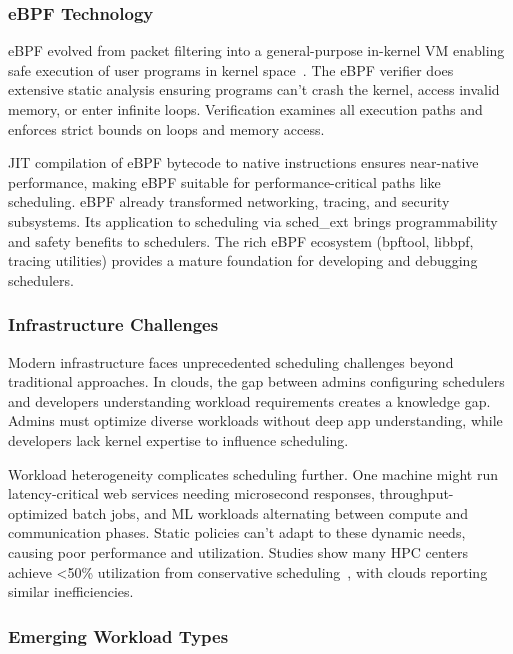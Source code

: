 \subsubsection{eBPF Technology}

eBPF evolved from packet filtering into a general-purpose in-kernel VM enabling safe execution of user programs in kernel space~\cite{mccanne1993bpf,gregg2019bpf}. The eBPF verifier does extensive static analysis ensuring programs can't crash the kernel, access invalid memory, or enter infinite loops. Verification examines all execution paths and enforces strict bounds on loops and memory access.

JIT compilation of eBPF bytecode to native instructions ensures near-native performance, making eBPF suitable for performance-critical paths like scheduling. eBPF already transformed networking, tracing, and security subsystems. Its application to scheduling via sched\_ext brings programmability and safety benefits to schedulers. The rich eBPF ecosystem (bpftool, libbpf, tracing utilities) provides a mature foundation for developing and debugging schedulers.

\subsubsection{Infrastructure Challenges}

Modern infrastructure faces unprecedented scheduling challenges beyond traditional approaches. In clouds, the gap between admins configuring schedulers and developers understanding workload requirements creates a knowledge gap. Admins must optimize diverse workloads without deep app understanding, while developers lack kernel expertise to influence scheduling.

Workload heterogeneity complicates scheduling further. One machine might run latency-critical web services needing microsecond responses, throughput-optimized batch jobs, and ML workloads alternating between compute and communication phases. Static policies can't adapt to these dynamic needs, causing poor performance and utilization. Studies show many HPC centers achieve <50\% utilization from conservative scheduling~\cite{feitelson2023utilization}, with clouds reporting similar inefficiencies.

\subsubsection{Emerging Workload Types}

